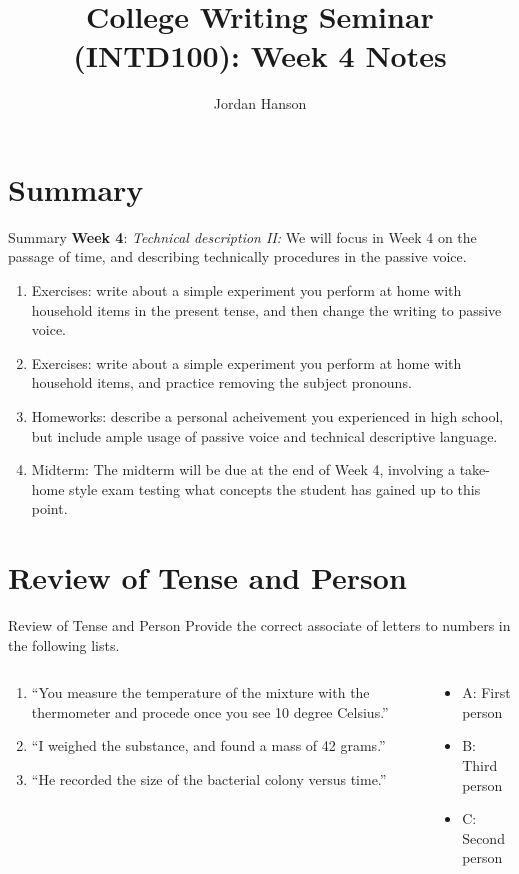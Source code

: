 \documentclass{beamer}
\title{College Writing Seminar (INTD100): Week 4 Notes}
\author{Jordan Hanson}
\institute{Whittier College Department of Physics and Astronomy}
\begin{document}
\maketitle

\section{Summary}

\begin{frame}{Summary}
\small
\textbf{Week 4}: \textit{Technical description II:} We will focus in Week 4 on the passage of time, and describing technically
procedures in the passive voice.
\begin{enumerate}
\item Exercises: write about a simple experiment you perform at home with household items in the present tense, and then change the writing to passive voice.
\item Exercises: write about a simple experiment you perform at home with household items, and practice removing the subject pronouns.
\item Homeworks: describe a personal acheivement you experienced in high school, but include ample usage of passive voice and technical descriptive language.
\item Midterm: The midterm will be due at the end of Week 4, involving a take-home style exam testing what concepts the student has gained up to this point.
\end{enumerate}
\end{frame}

\section{Review of Tense and Person}

\begin{frame}{Review of Tense and Person}
\small
\alert{Provide the correct associate of letters to numbers in the following lists.}
\begin{columns}[T]
\begin{column}{0.5\textwidth}
\begin{enumerate}
\item ``You measure the temperature of the mixture with the thermometer and procede once you see 10 degree Celsius.''
\item ``I weighed the substance, and found a mass of 42 grams.''
\item ``He recorded the size of the bacterial colony versus time.''
\end{enumerate}
\end{column}
\begin{column}{0.5\textwidth}
\begin{itemize}
\item A: First person
\item B: Third person
\item C: Second person
\end{itemize}
\end{column}
\end{columns}
\end{frame}
\end{document}
